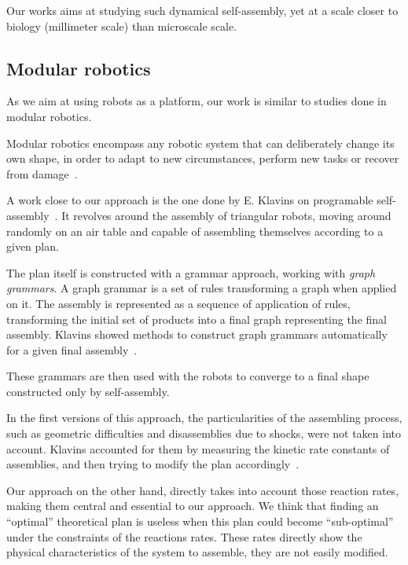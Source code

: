 		Our works aims at studying such dynamical self-assembly, yet at a scale closer to biology (millimeter scale) than microscale scale.
	
	\subsection{Modular robotics} %
	\label{sub:modular_robotics}
		As we aim at using robots as a platform, our work is similar to studies done in modular robotics.
		
		Modular robotics encompass any robotic system that can deliberately change its own shape, in order to adapt to new circumstances, perform new tasks or recover from damage~\cite{Shen:2007p2613}\cite{Werfel:2006p7594}.
		
		A work close to our approach is the one done by E. Klavins on programable self-assembly~\cite{Klavins:2007p2600, Bishop:2005p2706, McNew:2007p2781, Klavins:2005p3969}. It revolves around the assembly of triangular robots, moving around randomly on an air table and capable of assembling themselves according to a given plan.
		
		The plan itself is constructed with a grammar approach, working with \textit{graph grammars}. A graph grammar is a set of rules transforming a graph when applied on it. The assembly is represented as a sequence of application of rules, transforming the initial set of products into a final graph representing the final assembly. Klavins showed methods to construct graph grammars automatically for a given final assembly~\cite{Klavins:2005p3969}.
		
		These grammars are then used with the robots to converge to a final shape constructed only by self-assembly.
		
		In the first versions of this approach, the particularities of the assembling process, such as geometric difficulties and disassemblies due to shocks, were not taken into account. Klavins accounted for them by measuring the kinetic rate constants of assemblies, and then trying to modify the plan accordingly~\cite{Klavins:2007p2600}.
		
		Our approach on the other hand, directly takes into account those reaction rates, making them central and essential to our approach. We think that finding an ``optimal'' theoretical plan is useless when this plan could become ``sub-optimal'' under the constraints of the reactions rates. These rates directly show the physical characteristics of the system to assemble, they are not easily modified.
		
